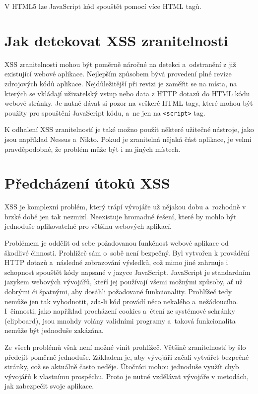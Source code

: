 \documentclass[11pt, conference, a4paper]{IEEEtran}
\begin{document}
V HTML5 lze JavaScript kód spouštět pomocí více HTML tagů.~\cite{swisskyrepo2024XSS}


\section{Jak detekovat XSS zranitelnosti}
XSS zranitelnosti mohou být poměrně náročné na detekci a~odstranění z již existující webové aplikace. Nejlepším způsobem bývá provedení plné revize zdrojových kódů aplikace. Nejdůležitější při revizi je zaměřit se na místa, na kterých se vkládají uživatelský vstup nebo data z HTTP dotazů do HTML kódu webové stránky. Je nutné dávat si pozor na veškeré HTML tagy, které mohou být použity pro spouštění JavaScript kódu, a~ne jen na \texttt{<script>} tag.

K odhalení XSS zranitelností je také možno použít některé užitečné nástroje, jako jsou například Nessus a~Nikto. Pokud je zranitelná nějaká část aplikace, je velmi pravděpodobné, že problém může být i na jiných místech.



\section{Předcházení útoků XSS}
XSS je komplexní problém, který trápí vývojáře už nějakou dobu a~rozhodně v brzké době jen tak nezmizí. Neexistuje hromadné řešení, které by mohlo být jednoduše aplikovatelné pro většinu webových aplikací.

Problémem je oddělit od sebe požadovanou funkčnost webové aplikace od škodlivé činnosti. Prohlížeč sám o~sobě není bezpečný. Byl vytvořen k provádění HTTP dotazů a~následné zobrazování výsledků, což mimo jiné zahrnuje i schopnost spouštět kódy napsané v jazyce JavaScript. JavaScript je standardním jazykem webových vývojářů, kteří jej používají všemi možnými způsoby, ať už dobrými či špatnými, aby dosáhli požadované funkcionality. Prohlížeč tedy nemůže jen tak vyhodnotit, zda-li kód provádí něco nekalého a~nežádoucího. I~činnosti, jako například procházení cookies a~čtení ze systémové schránky (clipboard), jsou mnohdy volány validními programy a~taková funkcionalita nemůže být jednoduše zakázána.

Ze všech problémů však není možné vinit prohlížeč. Většině zranitelností by šlo předejít poměrně jednoduše. Základem je, aby vývojáři začali vytvářet bezpečné stránky, což se aktuálně často neděje. Útočníci mohou jednoduše využít chyb vývojářů k vlastnímu prospěchu. Proto je nutné vzdělávat vývojáře v metodách, jak zabezpečit svoje aplikace.~\cite{Grossman2007}
\end{document}
